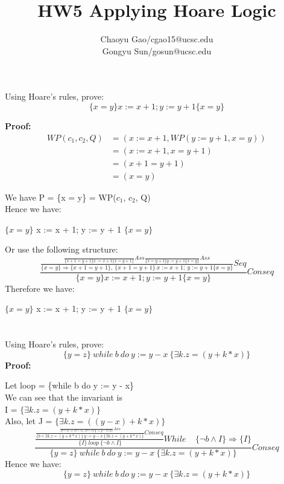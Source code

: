 \documentclass{article}
\author{Chaoyu Gao/cgao15@ucsc.edu \\ Gongyu Sun/gosun@ucsc.edu}
\title{ HW5 Applying Hoare Logic }
\begin{document}
\maketitle
{}
\section{  }

Using Hoare's rules, prove:
	\[ \{x = y\} x := x + 1; y := y + 1 \{x = y\} \]

	\textbf {Proof:}
	\begin{align*}
	WP(c_1, c_2, Q) &= (x := x + 1, WP(y := y+1, x = y)) \\
				  &= (x := x + 1, x = y + 1) \\
				  &= (x + 1 = y + 1) \\
				  &= (x = y)
	\end{align*}
	\begin{center}
	We have P = \{x = y\}  = WP($c_1$, $c_2$, Q)\\
	Hence we have:
	 \centerline {$\{x = y\}$ x := x + 1; y := y + 1 $\{x = y\}$ }
	 Or use the following structure:\\
	 $$\frac 
	 	{\frac
			{\frac
			{}{\displaystyle \{ x + 1 = y + 1\}x:= x + 1\{x = y + 1\}}Ass
			\frac
			{}{\displaystyle \{x = y + 1\}y:= y+ 1\{x = y\} }Ass
			}
			{\displaystyle \{x = y\}\Rightarrow \{x + 1 = y + 1\},\ \{x + 1 = y + 1\}\ x := x + 1;\ y := y + 1\{x = y\} }
			Seq
		}
		 {\{x = y\} x := x + 1; y := y + 1 \{x = y\}}
	 	Conseq$$
	Therefore we have:\\
	\centerline {$\{x = y\}$ x := x + 1; y := y + 1 $\{x = y\}$ }
	\end{center}
	
\section{}
	Using Hoare's rules, prove:
	 	\[ \{y = z\}\ while\  b\  do\  y := y - x\ \{ \exists k.z = (y + k \ast x)\} \]
	 \textbf {Proof:}
	 \begin{center}
	Let loop = \{while b do y := y - x\}\\
	We can see that the invariant is\\ I = $\{ \exists k.z = (y + k \ast x)\}$ \\
	Also, let J = $\{ \exists k.z = ((y - x)+ k \ast x)\}$
	$$\frac
		{\frac
			{\frac
				{\frac
					{}
					{\displaystyle \{ b \land I\} \Rightarrow  \{ b \land J\},\{ b \land J\}\ y := y -x\ \{I\}}\displaystyle Ass
				}
				{\displaystyle \{b \land  \exists k.z = (y + k \ast x)\} \ y := y -x\ \{ \exists k.z = (y + k \ast x)\} }\displaystyle Conseq
			}
			{\displaystyle \ \{ I \}\ loop\ \{ \neg b \land I\}}While\ \ \ \ \   \{ \neg b \land I\} \Rightarrow \{I\}
		}
		{\displaystyle\{y = z\}\ while\  b\  do\  y := y - x\ \{ \exists k.z = (y + k \ast x)\}}
		Conseq$$
	Hence we have:
	\[ \{y = z\}\ while\  b\  do\  y := y - x\ \{ \exists k.z = (y + k \ast x)\} \]
	\end{center}
	
\end{document}
